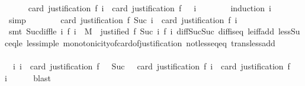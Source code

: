 \begin{isabellebody}
\ \ \ \ \isamarkupfalse%
\ {\isachardoublequoteopen}card\ {\isacharparenleft}justification\ {\isacharparenleft}f\ i{\isacharparenright}{\isacharparenright}\ {\isasymle}\ card\ {\isacharparenleft}justification\ {\isacharparenleft}f\ {}{\isacharparenright}{\isacharparenright}\ {\isacharminus}\ i{\isachardoublequoteclose}\isanewline
\ \ \ \ \ \ \isamarkupfalse%
\ {\isacharparenleft}induction\ i{\isacharparenright}\isanewline
\ \ \ \ \ \ \isamarkupfalse%
\ simp\isanewline
\ \ \ \ \ \ \isamarkupfalse%
\ {\isacartoucheopen}card\ {\isacharparenleft}justification\ {\isacharparenleft}f\ {\isacharparenleft}Suc\ i{\isacharparenright}{\isacharparenright}{\isacharparenright}\ {\isacharless}\ card\ {\isacharparenleft}justification\ {\isacharparenleft}f\ i{\isacharparenright}{\isacharparenright}{\isacartoucheclose}\isanewline
\ \ \ \ \ \ \isamarkupfalse%
\ {\isacharparenleft}smt\ Suc{\isacharunderscore}diff{\isacharunderscore}le\ {\isacartoucheopen}{\isasymforall}i{\isachardot}\ f\ i\ {\isasymin}\ M\ {\isasymand}\ justified\ {\isacharparenleft}f\ {\isacharparenleft}Suc\ i{\isacharparenright}{\isacharparenright}\ {\isacharparenleft}f\ i{\isacharparenright}{\isacartoucheclose}\ diff{\isacharunderscore}Suc{\isacharunderscore}Suc\ diff{\isacharunderscore}is{\isacharunderscore}{}{\isacharunderscore}eq\ le{\isacharunderscore}iff{\isacharunderscore}add\ less{\isacharunderscore}Suc{\isacharunderscore}eq{\isacharunderscore}le\ less{\isacharunderscore}imp{\isacharunderscore}le\ monotonicity{\isacharunderscore}of{\isacharunderscore}card{\isacharunderscore}of{\isacharunderscore}justification\ not{\isacharunderscore}less{\isacharunderscore}eq{\isacharunderscore}eq\ trans{\isacharunderscore}less{\isacharunderscore}add{}{\isacharparenright}\ \ \isanewline
\ \ \isamarkupfalse%
\isanewline
\ \ \isamarkupfalse%
\ \isamarkupfalse%
\ {\isachardoublequoteopen}{\isasymexists}\ i{\isachardot}\ i\ {\isacharequal}\ card\ {\isacharparenleft}justification\ {\isacharparenleft}f\ {}{\isacharparenright}{\isacharparenright}\ {\isacharplus}\ Suc\ {}\ {\isasymand}\ card\ {\isacharparenleft}justification\ {\isacharparenleft}f\ i{\isacharparenright}{\isacharparenright}\ {\isasymle}\ card\ {\isacharparenleft}justification\ {\isacharparenleft}f\ {}{\isacharparenright}{\isacharparenright}\ {\isacharminus}\ i{\isachardoublequoteclose}\isanewline
\ \ \ \ \isamarkupfalse%
\ blast\isanewline

\end{isabellebody}
